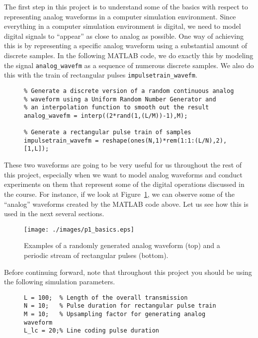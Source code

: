 \documentclass[letterpaper,12pt]{article}
\begin{document}
The first step in this project is to understand some of the basics with respect to representing analog waveforms in a computer 
simulation environment.  Since everything in a computer simulation environment is digital, we need to model digital signals to ``appear''
as close to analog as possible.  One way of achieving this is by representing a specific analog waveform using a substantial amount of 
discrete samples.  In the following MATLAB code, we do exactly this by modeling the signal \texttt{analog\_wavefm} as a sequence of numerous
discrete samples.  We also do this with the train of rectangular pulses \texttt{impulsetrain\_wavefm}.
\begin{figure}[h]
\centering
\begin{minipage}[framed]{0.9\textwidth}
\begin{lstlisting}
% Generate a discrete version of a random continuous analog
% waveform using a Uniform Random Number Generator and
% an interpolation function to smooth out the result
analog_wavefm = interp((2*rand(1,(L/M))-1),M);

% Generate a rectangular pulse train of samples
impulsetrain_wavefm = reshape(ones(N,1)*rem(1:1:(L/N),2),[1,L]);
\end{lstlisting}
\end{minipage}
\captionsetup{labelformat=empty}
\end{figure}

These two waveforms are going to be very useful for us throughout the rest of this project, especially when we want to model analog waveforms and
conduct experiments on them that represent some of the digital operations discussed in the course.  For instance, if we look at Figure~\ref{f:p1_basics}, we
can observe some of the ``analog'' waveforms created by the MATLAB code above.  Let us see how this is used in the next several sections.
\begin{figure}[h]
 \centering
 \texttt{[image: ./images/p1\_basics.eps]}
 \caption{Examples of a randomly generated analog waveform (top) and a periodic stream of rectangular pulses (bottom).}\label{f:p1_basics}
\end{figure}

Before continuing forward, note that throughout this project you should be using the following simulation parameters.
\begin{figure}[h]
\centering
\begin{minipage}[framed]{0.9\textwidth}
\begin{lstlisting}
L = 100;  % Length of the overall transmission
N = 10;   % Pulse duration for rectangular pulse train
M = 10;   % Upsampling factor for generating analog waveform
L_lc = 20;% Line coding pulse duration
\end{lstlisting}
\end{minipage}
\captionsetup{labelformat=empty}
\end{figure}
\end{document}
